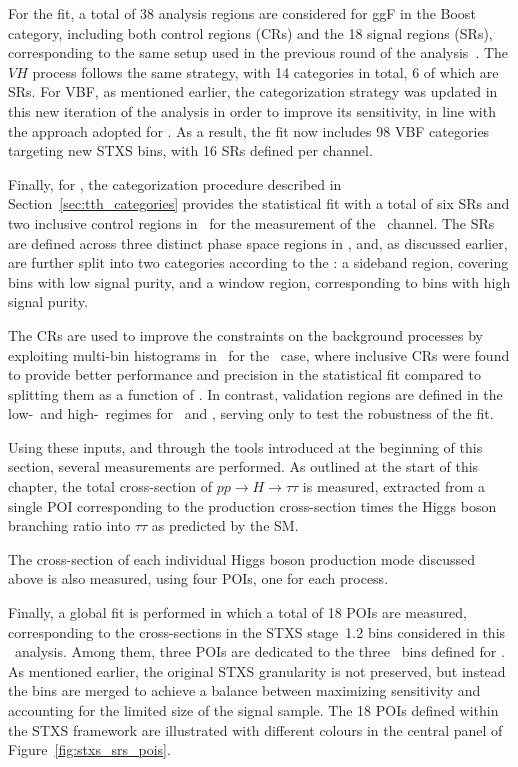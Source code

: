 For the fit, a total of 38 analysis regions are considered for ggF in the Boost category, 
including both control regions (CRs) and the 18 signal regions (SRs), corresponding to the same setup used in the previous round of the analysis~\cite{couplings}. 
The $VH$ process follows the same strategy, with 14 categories in total, 6 of which are SRs. 
For VBF, as mentioned earlier, the categorization strategy was updated in this new iteration of the analysis in order to improve its sensitivity, 
in line with the approach adopted for \ttH. 
As a result, the fit now includes 98 VBF categories targeting new STXS bins, with 16 SRs defined per channel.

Finally, for \ttH, the categorization procedure described in Section~\ref{sec:tth_categories} provides the statistical fit with a total of six SRs and two inclusive control regions in \pth\ for the measurement of the \tauhadhad\ channel. 
The SRs are defined across three distinct phase space regions in \pth, and, as discussed earlier, are further split into two categories according to the \mmc: 
a sideband region, covering bins with low signal purity, and a window region, corresponding to bins with high signal purity.

The CRs are used to improve the constraints on the background processes by exploiting multi-bin histograms in \mmc\ for the \ttHtt\ case, 
where inclusive CRs were found to provide better performance and precision in the statistical fit compared to splitting them as a function of \pth. 
In contrast, validation regions are defined in the low-\pt\ and high-\pt\ regimes for \ztautau\ and \ttbar, 
serving only to test the robustness of the fit. 

Using these inputs, and through the tools introduced at the beginning of this section, several measurements are performed. 
As outlined at the start of this chapter, the total cross-section of $pp \to H \to \tau\tau$ is measured, 
extracted from a single POI corresponding to the production cross-section times the Higgs boson branching ratio into $\tau\tau$ as predicted by the SM.

The cross-section of each individual Higgs boson production mode discussed above is also measured, 
using four POIs, one for each process.

Finally, a global fit is performed in which a total of 18 POIs are measured, 
corresponding to the cross-sections in the STXS stage~1.2 bins considered in this \htautau\ analysis. 
Among them, three POIs are dedicated to the three \pth\ bins defined for \ttH. 
As mentioned earlier, the original STXS granularity is not preserved, but instead the bins are merged to achieve a balance between maximizing sensitivity 
and accounting for the limited size of the signal sample. 
The 18 POIs defined within the STXS framework are illustrated with different colours in the central panel of Figure~\ref{fig:stxs_srs_pois}.

